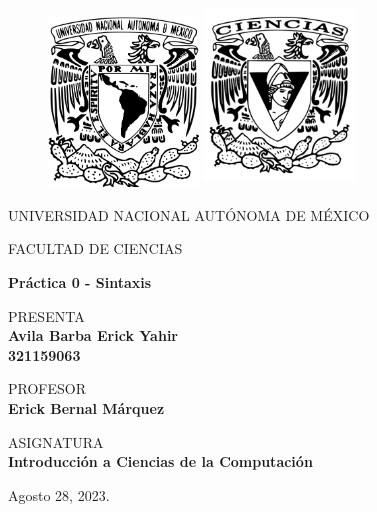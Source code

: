 \documentclass{article}
\newcommand{\autorName}{Avila Barba Erick Yahir} %
\newcommand{\noCuenta}{321159063} %
\newcommand{\fecha}{Agosto 28, 2023.} %
\newcommand{\tareaName}{Práctica 0 - Sintaxis} %
\newcommand{\profeName}{Erick Bernal Márquez} %
\newcommand{\materiaName}{Introducción a Ciencias de la Computación} %
\begin{document}
\thispagestyle{portada}
\begin{figure}[ht]
        \includegraphics[width=4cm]{Logo_UNAM.png}
        \label{EscudoUNAM}
   \endminipage
        \includegraphics[height = 4.9cm ,width=4cm]{Logo_FC.png}
        \label{EscudoFC}
    \endminipage
\end{figure}

\begin{center}
    \vspace{0.8cm}
    \LARGE
    UNIVERSIDAD NACIONAL AUTÓNOMA DE MÉXICO 
    
    \vspace{0.8cm}
    \LARGE
    FACULTAD DE CIENCIAS
    
    \vspace{1.7cm}	
    \Large
    \textbf{\tareaName}
    
    \vspace{1.3cm}
    \normalsize	
    PRESENTA \\
    \vspace{.3cm}
    \large
    \textbf{\autorName}\\
    \vspace{.2cm}
    \textbf{\noCuenta}
    
    \vspace{1.3cm}
    \normalsize	
    PROFESOR \\
    \vspace{.3cm}
    \large
    \textbf{\profeName}
    
    \vspace{1.3cm}
    \normalsize	
    ASIGNATURA \\
    \vspace{.3cm}
    \large
    \textbf{\materiaName}
    
    \vspace{1.3cm}
    \fecha
\end{center}
\end{document}
